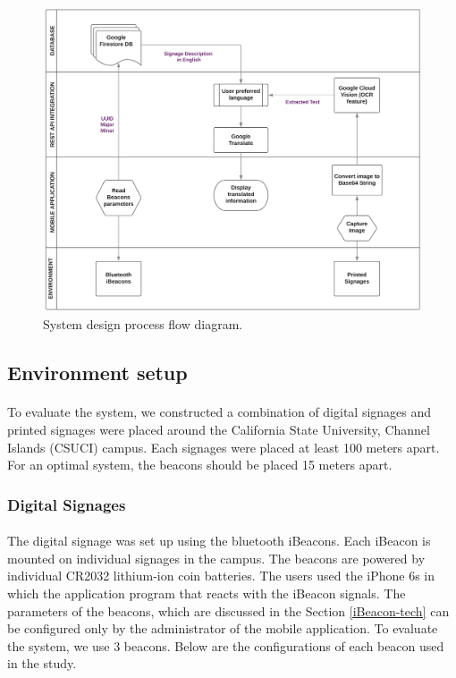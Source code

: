 \documentclass[12pt]{article}
\begin{document}
\begin{figure}[H]
	\centering
	\includegraphics[width=1\linewidth]{media/Architecture-3.png}
	\caption{System design process flow diagram. }
	\label{fig:system}
\end{figure} 

\subsection{Environment setup}
\label{env}
\paragraph{}To evaluate the system, we constructed a combination of digital signages and printed signages were placed around the California State University, Channel Islands (CSUCI) campus. Each signages were placed at least 100 meters apart. For an optimal system, the beacons should be placed 15 meters apart.

\subsubsection{Digital Signages}
\paragraph{}The digital signage was set up using the bluetooth iBeacons. Each iBeacon is mounted on individual signages in the campus. The beacons are powered by individual CR2032 lithium-ion coin batteries. The users used the iPhone 6s in which the application program that reacts with the iBeacon signals. The parameters of the beacons, which are discussed in the Section \ref{iBeacon-tech} can be configured only by the administrator of the mobile application. To evaluate the system, we use 3 beacons. Below are the configurations of each beacon used in the study.
\end{document}
